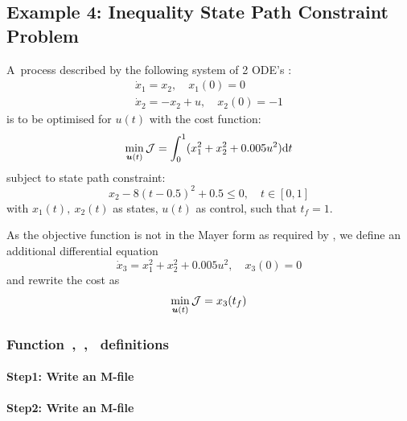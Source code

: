 \subsection{Example 4: Inequality State Path Constraint Problem}
\label{sec:statepathconprob}

A~process described by the following system of 2
ODE's \citep{jac69,fee98}:
\begin{gather}
\dot{x}_1 = x_{2}, \quad x_{1}(0) = 0\\
\dot{x}_2 = -x_{2} + u, \quad x_{2}(0) = -1
\end{gather}is to be optimised for $u(t)$ with the cost function:
\begin{equation}
\min_{\ve{u}(t)} \mf{J} = \int_{0}^{1}(x_{1}^{2} + x_{2}^{2} +
0.005u^{2})\dt \label{eq:ispcpa} 
\end{equation} subject to state path constraint:
\begin{equation}
x_{2} - 8(t - 0.5)^{2} + 0.5 \leq 0, \quad t \in [0,1]  
\end{equation} with $x_{1}(t),~x_{2}(t)$ as states, $u(t)$ as control,
such that $t_{f}=1$. 

As the objective function is not in the Mayer form as required by
, we define an additional differential equation
\begin{equation}
\dot{x}_3 =  x_1^2+x_2^2+0.005u^2, \quad x_3(0) = 0
\end{equation}
and rewrite the cost as
\begin{equation} 
\min_{\ve{u}(t)} \mf{J} = x_3(t_f) \label{eq:ispcpb} 
\end{equation}

\subsubsection{Function~,~,~  definitions}
\label{sec:statepathconprob-fundef}

\paragraph{Step1: Write an M-file }

{\small }

\paragraph{Step2: Write an M-file~}

